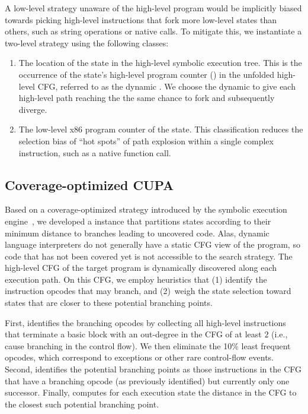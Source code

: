 A low-level strategy unaware of the high-level program would be implicitly biased towards picking high-level instructions that fork more low-level states than others, such as string operations or native calls.
%
To mitigate this, we instantiate a two-level \cupa strategy using the following classes:
\begin{enumerate}
\item The location of the state in the high-level symbolic execution tree.  This is the occurrence of the state's high-level program counter (\hlpc) in the unfolded high-level CFG, referred to as the dynamic \hlpc.  We choose the dynamic \hlpc to give each high-level path reaching the \hlpc the same chance to fork and subsequently diverge.
\item The low-level x86 program counter of the state.  This classification reduces the selection bias of ``hot spots'' of path explosion within a single complex instruction, such as a native function call.
\end{enumerate}

\subsection{Coverage-optimized CUPA}
\label{sec:chef:cupa-coverage}

Based on a coverage-optimized strategy introduced by the \klee symbolic execution engine~\cite{klee}, we developed a \cupa instance that partitions states according to their minimum distance to branches leading to uncovered code.
%
Alas, dynamic language interpreters do not generally have a static CFG view of the program, so code that has not been covered yet is not accessible to the search strategy.  The high-level CFG of the target program is dynamically discovered along each execution path.  On this CFG, we employ heuristics that (1) identify the instruction opcodes that may branch, and (2)~weigh the state selection toward states that are closer to these potential branching points.

First, \chef identifies the branching opcodes by collecting all high-level instructions that terminate a basic block with an out-degree in the CFG of at least $2$ (i.e., cause branching in the control flow).   We then eliminate the 10\% least frequent opcodes, which correspond to exceptions or other rare control-flow events.
%
Second, \chef identifies the potential branching points as those instructions in the CFG that have a branching opcode (as previously identified) but currently only one successor.
%
Finally, \chef computes for each execution state the distance in the CFG to the closest such potential branching point.

